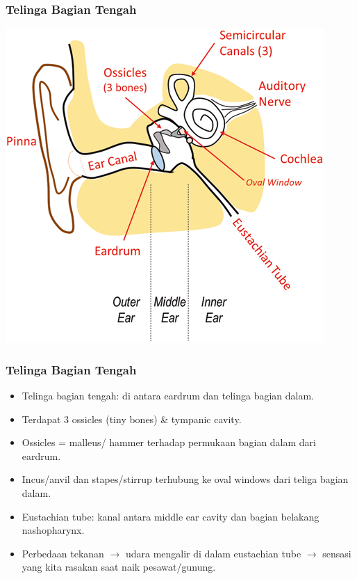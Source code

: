 \documentclass[pdflatex,compress]{beamer}
\begin{document}
\begin{frame}
	\frametitle{Telinga Bagian Tengah}
	\begin{center}
		\includegraphics[height=0.9\textheight]{img/img015}
	\end{center}
\end{frame}

\begin{frame}
	\frametitle{Telinga Bagian Tengah}
	\begin{itemize}
		\item Telinga bagian tengah: di antara eardrum dan telinga bagian dalam.
		\item Terdapat 3 ossicles (tiny bones) \& tympanic cavity.
		\item Ossicles = malleus/ hammer terhadap permukaan bagian dalam dari eardrum.
		\item Incus/anvil dan stapes/stirrup terhubung ke oval windows dari teliga bagian dalam.
		\item Eustachian tube: kanal antara middle ear cavity dan bagian belakang nashopharynx.
		\item Perbedaan tekanan $\rightarrow$ udara mengalir di dalam eustachian tube $\rightarrow$ sensasi yang kita rasakan saat naik pesawat/gunung.
	\end{itemize}
\end{frame}
\end{document}
